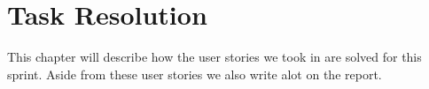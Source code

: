 \chapter{Task Resolution}
This chapter will describe how the user stories we took in  are solved for this sprint.
Aside from these user stories we also write alot on the report.




